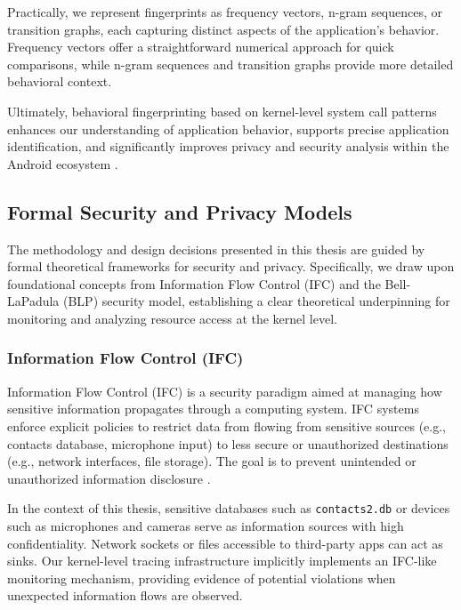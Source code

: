 \documentclass[a4paper,12pt]{report}
\begin{document}
Practically, we represent fingerprints as frequency vectors, n-gram sequences, or transition graphs, each capturing distinct aspects of the application's behavior. Frequency vectors offer a straightforward numerical approach for quick comparisons, while n-gram sequences and transition graphs provide more detailed behavioral context.

Ultimately, behavioral fingerprinting based on kernel-level system call patterns enhances our understanding of application behavior, supports precise application identification, and significantly improves privacy and security analysis within the Android ecosystem \cite{felt2011androidprivacy}.



\subsection{Formal Security and Privacy Models}

The methodology and design decisions presented in this thesis are guided by formal theoretical frameworks for security and privacy. Specifically, we draw upon foundational concepts from Information Flow Control (IFC) and the Bell-LaPadula (BLP) security model, establishing a clear theoretical underpinning for monitoring and analyzing resource access at the kernel level.

\subsubsection{Information Flow Control (IFC)}

Information Flow Control (IFC) is a security paradigm aimed at managing how sensitive information propagates through a computing system. IFC systems enforce explicit policies to restrict data from flowing from sensitive sources (e.g., contacts database, microphone input) to less secure or unauthorized destinations (e.g., network interfaces, file storage). The goal is to prevent unintended or unauthorized information disclosure \cite{myers1999jflow,sabelfeld2003language}.

In the context of this thesis, sensitive databases such as \texttt{contacts2.db} or devices such as microphones and cameras serve as information sources with high confidentiality. Network sockets or files accessible to third-party apps can act as sinks. Our kernel-level tracing infrastructure implicitly implements an IFC-like monitoring mechanism, providing evidence of potential violations when unexpected information flows are observed.
\end{document}
